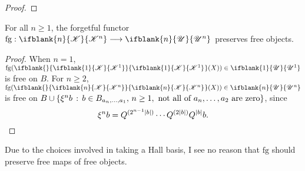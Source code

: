 \documentclass[10pt]{article}
\newcommand{\RestLie}[1]{\mathsf{r}{\scrL}^{#1}}%
\newcommand{\LL}[1]{\ifblank{#1}{\scrK}{\scrK^{#1}}}
\newcommand{\nontop}[1]{\ifblank{#1}{\scrU}{\scrU^{#1}}}
\newcommand{\iteratedrestn}[2]{\xi^{#2}{#1}}
\newcommand{\forget}{\mathrm{fg}}
\newcommand{\Fr}[2][]{\ifblank{#1}{#2}{#2_{#1}}}
\renewcommand{\Q}{Q}
\begin{document}
\begin{CategoriesOfInterest}
\begin{proof}
%
\end{proof}
\begin{cor}
For all $n\geq 1$, the forgetful functor $\forget:\LL{n}\to\nontop{n}$ preserves free objects.
\end{cor}
\begin{proof}
When $n=1$, $\forget(\Fr{\LL{1}}(X))\in\nontop{1}$ is free on $B$. For $n\geq2$, $\forget(\Fr{\LL{n}}(X))\in\nontop{n}$  is free on $B\cup \{\iteratedrestn{b}{n}\,:\,b\in B_{a_{n},\ldots,a_1},\,n\geq1,\textup{ not all of $a_n,\ldots,a_2$ are zero}\}$, since
\[\iteratedrestn{b}{n}=\Q^{(2^{n-1}|b|)}\cdots \Q^{(2|b|)}\Q^{|b|}b.\qedhere\]
\end{proof}
\noindent Due to the choices involved in taking a Hall basis, I see no reason that $\forget$ should preserve free maps of free objects.
\end{CategoriesOfInterest}
\end{document}
